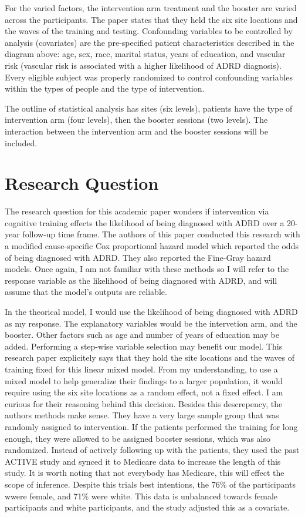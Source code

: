 \documentclass[11pt]{article}
\begin{document}
For the varied factors, the intervention arm treatment and the booster are varied across the participants.
The paper states that they held the six site locations and the waves of the training and testing.
Confounding variables to be controlled by analysis (covariates) are the pre-specified patient characteristics described in the diagram above: age, sex, race, marital status, years of education, and vascular risk (vascular risk is associated with a higher likelihood of ADRD diagnosis). Every eligible subject was properly randomized to control confounding variables within the types of people and the type of intervention.

The outline of statistical analysis has sites (six levels), patients have the type of intervention arm (four levels), then the booster sessions (two levels). The interaction between the intervention arm and the booster sessions will be included.


\section{Research Question}
\label{sec:org6c28c75}

The research question for this academic paper wonders if intervention via cognitive training effects the likelihood of being diagnosed with ADRD over a 20-year follow-up time frame.
The authors of this paper conducted this research with a modified cause-specific Cox proportional hazard model which reported the odds of being diagnosed with ADRD. They also reported the Fine-Gray hazard models. Once again, I am not familiar with these methods so I will refer to the response variable as the likelihood of being diagnosed with ADRD, and will assume that the model's outputs are reliable.

In the theorical model, I would use the likelihood of being diagnosed with ADRD as my response.
The explanatory variables would be the intervetion arm, and the booster.
Other factors such as age and number of years of education may be added.
Performing a step-wise variable selection may benefit our model. This research paper explicitely says that they hold the site locations and the waves of training fixed for this linear mixed model. 
From my understanding, to use a mixed model to help generalize their findings to a larger population, it would require using the six site locations as a random effect, not a fixed effect.
I am curious for their reasoning behind this decision. Besides this descrepency, the authors methods make sense. They have a very large sample group that was randomly assigned to intervention. If the patients performed the training for long enough, they were allowed to be assigned booster sessions, which was also randomized. Instead of actively following up with the patients, they used the past ACTIVE study and synced it to Medicare data to increase the length of this study. It is worth noting that not everybody has Medicare, this will effect the scope of inference. Despite this trials best intentions, the 76\% of the participants wwere female, and 71\% were white. This data is unbalanced towards female participants and white participants, and the study adjusted this as a covariate.
\end{document}
